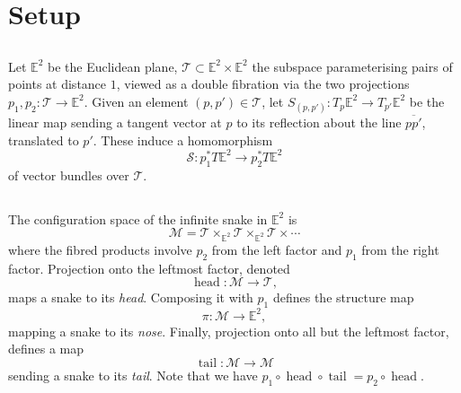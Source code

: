 \documentclass{amsart}
\def\EE{\mathbb{E}}
\def\sT{\mathscr{T}}
\def\sM{\mathscr{M}}
\def\sS{\mathscr{S}}
\DeclareMathOperator{\stail}{{\mathrm{tail}}}
\DeclareMathOperator{\shead}{{\mathrm{head}}}
\theoremstyle{definition}
\begin{document}
\section{Setup}

\subsection{}
Let $\EE^2$ be the Euclidean plane, $\sT \subset \EE^2 \times \EE^2$
the subspace parameterising pairs of points at distance $1$, viewed
as a double fibration via the two projections $p_1,p_2 : \sT \to \EE^2$.
Given an element
$(p,p') \in \sT$, let $S_{(p,p')} : T_p\EE^2 \to T_{p'}\EE^2$
be the linear map sending a tangent vector at $p$ to
its reflection about the line $\overline{pp'}$, translated
to $p'$. These induce a homomorphism 
$$ \sS : p_1^* T\EE^2 \to p_2^* T\EE^2  $$
of vector bundles over $\sT$.

\subsection{}
The configuration space of the infinite snake in $\EE^2$ is
$$ \sM = \sT \times_{\EE^2} \sT \times_{\EE^2} \sT \times \cdots $$
where the fibred products involve $p_2$ from the left factor and $p_1$ from the right factor.
Projection onto the leftmost factor, denoted $$ \shead : \sM \to \sT,$$ 
maps a snake to its \emph{head}.
Composing it with $p_1$ defines the structure map $$\pi : \sM \to \EE^2,$$ mapping
a snake to its \emph{nose}. Finally, projection onto all but the leftmost factor,
defines a map
$$ \stail:\sM \to \sM $$
sending a snake to its \emph{tail}.
Note that we have $p_1\circ\shead\circ\stail = p_2\circ\shead$.
\end{document}
